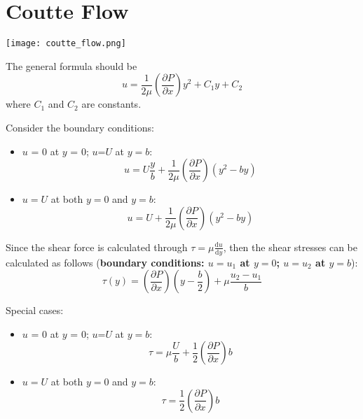 \documentclass[12pt]{article}
\begin{document}
\section{Coutte Flow}

\texttt{[image: coutte\_flow.png]}

The general formula should be
\begin{equation}
    u = \frac{1}{2\mu} (\frac{\partial P}{\partial x}) y^2 + C_1y + C_2
\end{equation}
where $C_1$ and $C_2$ are constants.

Consider the boundary conditions:
\begin{itemize}
    \item $u$ = 0 at $y$ = 0; $u$=$U$ at $y=b$:
        $$ u = U\frac{y}{b} + \frac{1}{2\mu}(\frac{\partial P}{\partial x})(y^2 - by) $$
    \item $u=U$ at both $y=0$ and $y=b$:
        $$  u = U + \frac{1}{2\mu}(\frac{\partial P}{\partial x})(y^2 - by) $$
\end{itemize}

Since the shear force is calculated through $\tau = \mu \frac{\mathrm{d}u}{\mathrm{d}y}$,
then the shear stresses can be calculated as follows (\textbf{boundary conditions: $u = u_1$ at $y=0$; $u = u_2$ at $y = b$}):
$$ \tau(y) = (\frac{\partial P}{\partial x})(y - \frac{b}{2}) + \mu \frac{u_2 - u_1}{b} $$

Special cases:
\begin{itemize}
    \item $u$ = 0 at $y$ = 0; $u$=$U$ at $y=b$:
        $$ \tau = \mu \frac{U}{b} + \frac{1}{2}(\frac{\partial P}{\partial x})b $$
    \item $u=U$ at both $y=0$ and $y=b$:
        $$  \tau =  \frac{1}{2}(\frac{\partial P}{\partial x})b $$
\end{itemize}
\end{document}
